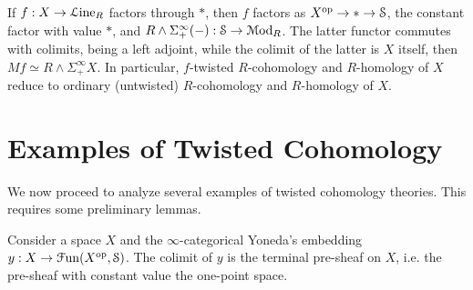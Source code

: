 \documentclass[10pt]{amsart}
\begin{document}
\begin{example} If $f:X\to \mathcal{L}\mathrm{ine}_R$ factors through $*$, then $f$ factors as $X^{\mathrm{op}}\to*\to\mathcal{S}$, the constant factor with value $*$, and $R\wedge\Sigma^\infty_+(-):\mathcal{S}\to\mathcal{M}\mathrm{od}_R$. The latter functor commutes with colimits, being a left adjoint, while the colimit of the latter is $X$ itself, then $Mf\simeq R\wedge\Sigma^\infty_+X$. In particular, $f$-twisted $R$-cohomology and $R$-homology of $X$ reduce to ordinary (untwisted) $R$-cohomology and $R$-homology of $X$. 
\end{example}


\section{Examples of Twisted Cohomology}
We now proceed to analyze several examples of twisted cohomology	theories. This requires some preliminary lemmas.

\begin{lemma}
	Consider a space $X$ and the $\infty$-categorical Yoneda's embedding $y:X\to\mathcal{F}\mathrm{un}(X^{\mathrm{op}},\mathcal{S})$. The colimit of $y$ is the terminal pre-sheaf on $X$, i.e. the pre-sheaf with constant value the one-point space. 
\end{lemma}
\end{document}
